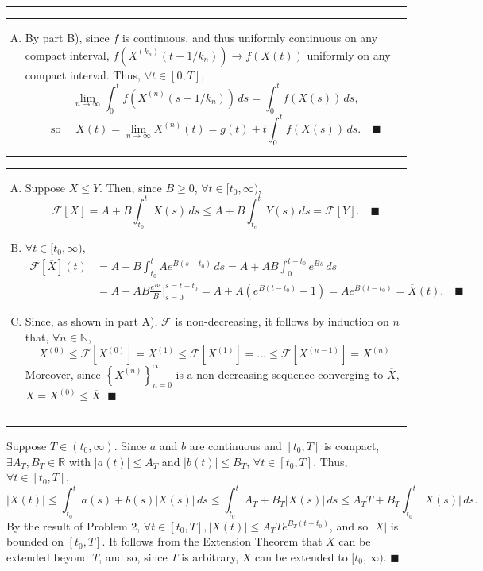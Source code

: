 \documentclass[11pt]{article}
\newcounter{questionCounter}
\newcounter{partCounter}[questionCounter]
\newenvironment{question}[2][\arabic{questionCounter}]{%
    \setcounter{partCounter}{0}%
    \vspace{.25in} \hrule \vspace{0.5em}%
        \noindent{\bf #2}%
    \vspace{0.8em} \hrule \vspace{.10in}%
    \addtocounter{questionCounter}{1}%
}{}
\renewcommand{\qed}{\quad $\blacksquare$}
\newcommand{\mqed}{\quad \blacksquare}
\newcommand{\N}{\mathbb{N}} %
\newcommand{\R}{\mathbb{R}} %
\newcommand{\F}{\mathcal{F}}
\begin{document}
\begin{question}{Problem 1}
\begin{enumerate}[A)]
\item By part B), since $f$ is continuous, and thus uniformly
continuous on any compact interval, $f(X^{(k_n)}(t - 1/k_n)) \rightarrow
f(X(t))$ uniformly on any compact interval. Thus, $\forall t \in [0,T]$,
\[
 \lim_{n \rightarrow \infty} \int_0^t f(X^{(n)}(s - 1/k_n)) \, ds
 = \int_0^t f(X(s)) \, ds,
\]
\[\mbox{so }\quad
 X(t)
 = \lim_{n \rightarrow \infty} X^{(n)}(t)
 = g(t) + t\int_0^t f(X(s)) \, ds. \mqed
\]

\end{enumerate}
\end{question}

\begin{question}{Problem 2}
\begin{enumerate}[A)]
\item Suppose $X \leq Y$. Then, since $B \geq 0$,
$\forall t \in [t_0, \infty)$,
\[
\F[X]
 = A + B \int_{t_0}^t X(s) \, ds
 \leq A + B \int_{t_e}^t Y(s) \, ds
 = \F[Y]. \mqed
\]

\item $\forall t \in [t_0,\infty)$,
\begin{align*}
\F[\overline{X}](t)
 & = A + B \int_{t_0}^t Ae^{B(s - t_0)} \, ds
   = A + A B \int_{0}^{t - t_0} e^{Bs} \, ds \\
 & = A + A B \frac{e^{Bs}}{B} \bigg|_{s = 0}^{s = t - t_0}
   = A + A \left(e^{B(t - t_0)} - 1 \right)
   = Ae^{B(t - t_0)}
   = \overline{X}(t). \mqed
\end{align*}

\item Since, as shown in part A), $\F$ is non-decreasing, it follows by
induction on $n$ that, $\forall n \in \N$, 
\[X^{(0)} \leq \F[X^{(0)}] = X^{(1)} \leq \F[X^{(1)}] = \ldots \leq 
\F[X^{(n-1)}] = X^{(n)}.\]
Moreover, since $\left\{ X^{(n)} \right\}_{n = 0}^{\infty}$ is a
non-decreasing sequence converging to $\overline{X}$, $X = X^{(0)} \leq
\overline{X}$. \qed

\end{enumerate}
\end{question}

\begin{question}{Problem 3}
Suppose $T \in (t_0,\infty)$. Since $a$ and $b$ are continuous and $[t_0,T]$ is
compact, $\exists A_T,B_T \in \R$ with $|a(t)| \leq A_T$ and $|b(t)| \leq B_T$,
$\forall t \in [t_0,T]$. Thus, $\forall t \in [t_0,T]$,
\[
 |X(t)| \leq \int_{t_0}^ta(s) + b(s)|X(s)| \, ds
        \leq \int_{t_0}^tA_T + B_T|X(s)| \, ds
        \leq A_TT + B_T\int_{t_0}^t|X(s)| \, ds.
\]
By the result of Problem 2, $\forall t \in [t_0,T], |X(t)| \leq
A_TTe^{B_T(t - t_0)}$, and so $|X|$ is bounded on $[t_0,T]$. It follows from the
Extension Theorem that $X$ can be extended beyond $T$, and so, since $T$ is
arbitrary, $X$ can be extended to $[t_0,\infty)$. \qed
\end{question}
\end{document}
